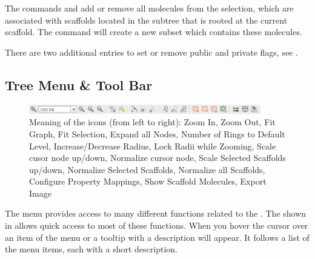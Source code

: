 The commands  and  add or remove all
molecules from the selection, which are associated with scaffolds located in the
subtree that is rooted at the current scaffold. The command  will create a new subset which contains these molecules.

There are two additional entries to set or remove public and private flags, see
.

\subsection{Tree Menu \& Tool Bar} \label{sec:treeview:menutoolbar}
\begin{figure}[!htb]
   \centering
   \includegraphics[width=0.9\textwidth]{images/stree/toolbar.png}
   \caption[\Stview \tbar]{
      Meaning of the icons (from left to right): Zoom In, Zoom Out, Fit Graph,
      Fit Selection, Expand all Nodes, Number of Rings to Default Level,
      Increase/Decrease Radius, Lock Radii while Zooming, Scale cusor node
      up/down, Normalize cursor node, Scale Selected Scaffolds up/down,
      Normalize Selected Scaffolds, Normalize all Scaffolds, Configure Property
      Mappings, Show Scaffold Molecules, Export Image
   }
   \label{fig:treeview:toolbar}
\end{figure}

The  menu provides access to many different functions related to the
\stview. The \tbar shown in  allows quick
access to most of these functions. When you hover the cursor over an item of the
menu or \tbar a tooltip with a description will appear. It follows a list of
the menu items, each with a short description.

